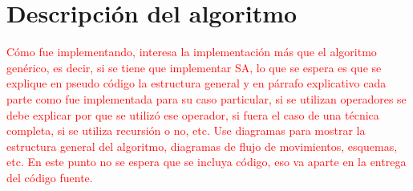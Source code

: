 \section{Descripción del algoritmo}

\textcolor{red}{Cómo fue implementando, interesa la implementación más que el algoritmo genérico, es decir, si se tiene que implementar SA, lo que se espera es que se explique en pseudo código la estructura general y en párrafo explicativo cada parte como fue implementada para su caso particular, si se utilizan operadores se debe explicar por que se utilizó ese operador, si fuera el caso de una técnica completa, si se utiliza recursión o no, etc. Use diagramas para mostrar la estructura general del algoritmo, diagramas de flujo de movimientos, esquemas, etc. En este punto no se espera que se incluya código, eso va aparte en la entrega del código fuente.}
